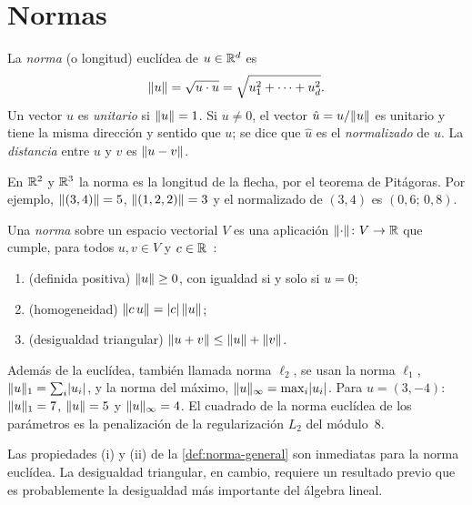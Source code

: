 \section{Normas}

\begin{definicion}\label{def:norma}
La \emph{norma} (o longitud) euclídea de $u\in\mathbb{R}^{d}$ es
\[
\lVert u\rVert=\sqrt{u\cdot u}=\sqrt{u_1^{2}+\dots+u_d^{2}}.
\]
Un vector $u$ es \emph{unitario} si $\lVert u\rVert=1$. Si $u\neq 0$, el vector $\hat u=u/\lVert u\rVert$ es unitario y tiene la misma dirección y sentido que $u$; se dice que $\hat u$ es el \emph{normalizado} de $u$. La \emph{distancia} entre $u$ y $v$ es $\lVert u-v\rVert$.
\end{definicion}

En $\mathbb{R}^{2}$ y $\mathbb{R}^{3}$ la norma es la longitud de la flecha, por el teorema de Pitágoras. Por ejemplo, $\lVert(3,4)\rVert=5$, $\lVert(1,2,2)\rVert=3$ y el normalizado de $(3,4)$ es $(0{,}6;\,0{,}8)$.

\begin{definicion}[Norma]\label{def:norma-general}
Una \emph{norma} sobre un espacio vectorial $V$ es una aplicación $\lVert\cdot\rVert\colon V\to\mathbb{R}$ que cumple, para todos $u,v\in V$ y $c\in\mathbb{R}$~\cite[§3.1]{mml}:
\begin{enumerate}
  \item (definida positiva) $\lVert u\rVert\ge 0$, con igualdad si y solo si $u=0$;
  \item (homogeneidad) $\lVert c\,u\rVert=\lvert c\rvert\,\lVert u\rVert$;
  \item (desigualdad triangular) $\lVert u+v\rVert\le\lVert u\rVert+\lVert v\rVert$.
\end{enumerate}
\end{definicion}

\begin{ejemplo}
Además de la euclídea, también llamada norma $\ell_2$, se usan la norma $\ell_1$, $\lVert u\rVert_1=\sum_i\lvert u_i\rvert$, y la norma del máximo, $\lVert u\rVert_\infty=\max_i\lvert u_i\rvert$. Para $u=(3,-4)$: $\lVert u\rVert_1=7$, $\lVert u\rVert=5$ y $\lVert u\rVert_\infty=4$. El cuadrado de la norma euclídea de los parámetros es la penalización de la regularización $L_2$ del módulo~8.
\end{ejemplo}

Las propiedades (i) y (ii) de la \cref{def:norma-general} son inmediatas para la norma euclídea. La desigualdad triangular, en cambio, requiere un resultado previo que es probablemente la desigualdad más importante del álgebra lineal.


